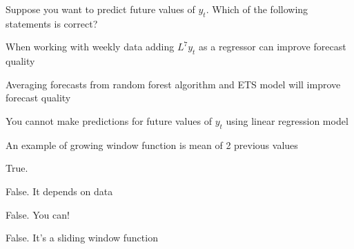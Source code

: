 
\begin{question}
Suppose you want to predict future values of \(y_t\). Which of the following statements is correct?
\begin{answerlist}
  \item When working with weekly data adding \(L^7y_t\) as a regressor can improve forecast quality
  \item Averaging forecasts from random forest algorithm and ETS model will improve forecast quality
  \item You cannot make predictions for future values of \(y_t\) using linear regression model
  \item An example of growing window function is mean of 2 previous values
\end{answerlist}
\end{question}

\begin{solution}
\begin{answerlist}
  \item True.
  \item False. It depends on data
  \item False. You can!
  \item False. It's a sliding window function
\end{answerlist}
\end{solution}

